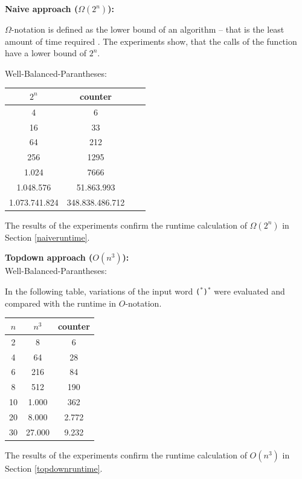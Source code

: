 \documentclass[a4paper, 11pt]{article}
\begin{document}
\textbf{Naive approach ($\Omega(2^n)$):}

$\Omega$-notation is defined as the lower bound of an algorithm -- that is the least amount of time required \cite{GFG}. The experiments show, that the calls of the function have a lower bound of $2^n$.

Well-Balanced-Parantheses: 
\begin{center}
\begin{tabular}{|c|c|c|c|}
\hline
$2^n$ & counter \\
\hline
4 &  6\\
16 &  33\\
64 &  212\\
256 &  1295\\
1.024 &  7666 \\
1.048.576 &  51.863.993\\
1.073.741.824 &  348.838.486.712\\
\hline
\end{tabular}
\end{center}


The results of the experiments confirm the runtime calculation of $\Omega(2^n)$ in Section \ref{naiveruntime}. 







\textbf{Topdown approach ($O(n^3)$):} \\
Well-Balanced-Parantheses: 

In the following table, variations of the input word \texttt{($^*$)$^*$} were evaluated and compared with the runtime in $O$-notation.

\begin{center}
\begin{tabular}{|c|c|c|}
\hline
$n$ & $n^3$ & counter \\
\hline
2& 8 & 6\\
4& 64 & 28\\
6& 216 & 84\\
8& 512 & 190\\
10& 1.000 & 362 \\
20& 8.000 & 2.772\\
30& 27.000 & 9.232\\
\hline
\end{tabular}
\end{center}

The results of the experiments confirm the runtime calculation of $O(n^3)$ in Section \ref{topdownruntime}.
\end{document}
